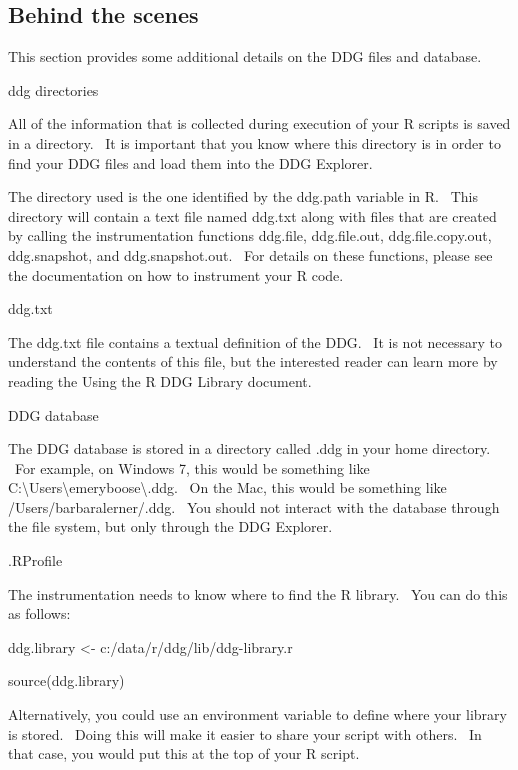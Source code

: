 \documentclass[letterpaper]{article}
\begin{document}
\subsection[Behind the scenes]{Behind the scenes}
{\mdseries\upshape\color{black}
This section provides some additional details on the DDG files and database.}

{\color{black}
ddg directories}

{\mdseries\upshape\color{black}
All of the information that is collected during execution of your R scripts is saved in a directory. \ It is important that you know where this directory is in order to find your DDG files and load them into the DDG Explorer.}

{\mdseries\upshape\color{black}
The directory used is the one identified by the ddg.path variable in R. \ This directory will contain a text file named ddg.txt along with files that are created by calling the instrumentation functions ddg.file, ddg.file.out, ddg.file.copy.out, ddg.snapshot, and ddg.snapshot.out. \ For details on these functions, please see the documentation on how to instrument your R code.}

{\color{black}
ddg.txt}

{\mdseries\upshape\color{black}
The ddg.txt file contains a textual definition of the DDG. \ It is not necessary to understand the contents of this file, but the interested reader can learn more by reading the Using the R DDG Library document.}

{\color{black}
DDG database}

{\mdseries\upshape\color{black}
The DDG database is stored in a directory called .ddg in your home directory. \ For example, on Windows 7, this would be something like C:{\textbackslash}Users{\textbackslash}emeryboose{\textbackslash}.ddg. \ On the Mac, this would be something like /Users/barbaralerner/.ddg. \ You should not interact with the database through the file system, but only through the DDG Explorer.}

{\color{black}
.RProfile}

{\mdseries\upshape\color{black}
The instrumentation needs to know where to find the R library. \ You can do this as follows:}

{\color{black}
ddg.library {\textless}- {\textquotedbl}c:/data/r/ddg/lib/ddg-library.r{\textquotedbl}}

{\mdseries\upshape\color{black}
source(ddg.library)}

{\mdseries\upshape\color{black}
Alternatively, you could use an environment variable to define where your library is stored. \ Doing this will make it easier to share your script with others. \ In that case, you would put this at the top of your R script.}
\end{document}
